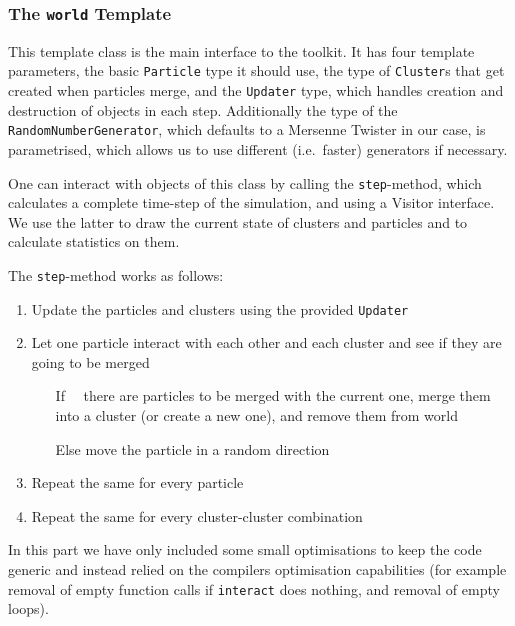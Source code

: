 \documentclass[twocolumn, 10pt]{scrartcl}
\begin{document}
            \subsubsection{The \lstinline!world! Template}
                This template class is the main interface to the toolkit. It has four template parameters, the basic
                \lstinline!Particle! type it should use, the type of \mbox{\lstinline!Cluster!s} that get created when
                particles merge, and the \lstinline!Updater! type, which handles creation and destruction of objects in
                each step.  Additionally the type of the \lstinline!RandomNumberGenerator!, which defaults to a Mersenne
                Twister in our case, is parametrised, which allows us to use different (i.e.\ faster) generators if
                necessary.

                One can interact with objects of this class by calling the \lstinline!step!-method, which calculates a
                complete time-step of the simulation, and using a Visitor interface. We use the latter to draw the
                current state of clusters and particles and to calculate statistics on them.

                The \lstinline!step!-method works as follows:
                \begin{enumerate}
                    \item Update the particles and clusters using the provided \lstinline!Updater!
                    \item Let one particle interact with each other and each cluster and see if they are going to be
                        merged
                        \begin{itemize}
                            \item[If~~] there are particles to be merged with the current one, merge them into a cluster
                              (or create a new one), and remove them from world
                            \item[Else] move the particle in a random direction
                        \end{itemize}
                    \item Repeat the same for every particle
                    \item Repeat the same for every cluster-cluster combination
                \end{enumerate}
                In this part we have only included some small optimisations to keep the code generic and instead relied
                on the compilers optimisation capabilities (for example removal of empty function calls if
                \lstinline'interact' does nothing, and removal of empty loops).
\end{document}
